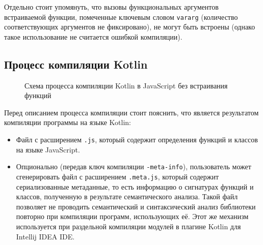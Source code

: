 Отдельно стоит упомянуть, что вызовы функциональных аргументов встраиваемой функции, помеченные
ключевым словом \texttt{vararg} (количество соответствующих
аргументов не фиксировано), не могут быть встроены (однако
такое использование не считается ошибкой компиляции).

\subsection{Процесс компиляции Kotlin}

\begin{figure}[H]

\caption{Схема процесса компиляции Kotlin в JavaScript без встраивания функций}
\label{fig:compilation1}
\end{figure}

Перед описанием процесса компиляции стоит пояснить,
что является результатом компиляции программы на языке Kotlin:
\begin{itemize}
  \item Файл с расширением \texttt{.js}, который содержит
  определения функций и классов на языке JavaScript.
  \item Опционально (передав ключ компиляции \texttt{-meta-info}),
  пользователь может сгенерировать файл с расширением
  \texttt{.meta.js}, который содержит сериализованные метаданные,
  то есть информацию о сигнатурах функций и классов,
  полученную в результате семантического анализа.
  Такой файл позволяет не проводить семантический и синтаксический
  анализ библиотеки повторно при компиляции программ,
  использующих её. Этот же механизм используется
  при раздельной компиляции модулей в плагине Kotlin для
  Intellij IDEA IDE.
\end{itemize}

